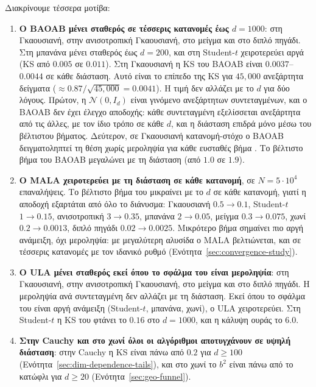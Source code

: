 Διακρίνουμε τέσσερα μοτίβα:

\begin{enumerate}
  \item \textbf{Ο BAOAB μένει σταθερός σε τέσσερις κατανομές έως $d=1000$}: στη
        Γκαουσιανή, στην ανισοτροπική Γκαουσιανή, στο μείγμα και στο διπλό πηγάδι.
        Στη μπανάνα μένει σταθερός έως $d=200$, και στη Student-$t$ χειροτερεύει
        αργά (KS από $0.005$ σε $0.011$). Στη Γκαουσιανή η KS του BAOAB είναι
        $0.0037$--$0.0044$ σε κάθε διάσταση. Αυτό είναι το επίπεδο της KS για
        $45{,}000$ ανεξάρτητα δείγματα ($\approx 0.87/\sqrt{45{,}000} = 0.0041$). Η τιμή δεν
        αλλάζει με το $d$ για δύο λόγους. Πρώτον, η $\mathcal{N}(0, I_d)$ είναι
        γινόμενο ανεξάρτητων συντεταγμένων, και ο BAOAB δεν έχει έλεγχο αποδοχής:
        κάθε συντεταγμένη εξελίσσεται ανεξάρτητα από τις άλλες, με τον ίδιο τρόπο
        σε κάθε $d$, και η διάσταση επιδρά μόνο μέσω του βέλτιστου βήματος.
        Δεύτερον, σε Γκαουσιανή κατανομή-στόχο ο BAOAB δειγματοληπτεί τη θέση χωρίς μεροληψία
      για κάθε ευσταθές βήμα \citep{leimkuhler2013bao}. Το βέλτιστο βήμα του
        BAOAB μεγαλώνει με τη διάσταση (από $1.0$ σε $1.9$).
  \item \textbf{Ο MALA χειροτερεύει με τη διάσταση σε κάθε κατανομή}, σε
        $N = 5 \cdot 10^4$ επαναλήψεις. Το βέλτιστο βήμα του μικραίνει με το $d$ σε
        κάθε κατανομή, γιατί η αποδοχή εξαρτάται από όλο το διάνυσμα: Γκαουσιανή
        $0.5 \to 0.1$, Student-$t$ $1 \to 0.15$, ανισοτροπική $3 \to 0.35$, μπανάνα
        $2 \to 0.05$, μείγμα $0.3 \to 0.075$, χωνί $0.2 \to 0.0013$, διπλό πηγάδι
        $0.02 \to 0.0025$. Μικρότερο βήμα σημαίνει πιο αργή ανάμειξη, όχι
        μεροληψία: με μεγαλύτερη αλυσίδα ο MALA βελτιώνεται, και σε τέσσερις
        κατανομές με τον ιδανικό ρυθμό (Ενότητα~\ref{sec:convergence-study}).
  \item \textbf{Ο ULA μένει σταθερός εκεί όπου το σφάλμα του είναι μεροληψία}: στη
        Γκαουσιανή, στην ανισοτροπική Γκαουσιανή, στο μείγμα και στο διπλό πηγάδι.
        Η μεροληψία ανά συντεταγμένη δεν αλλάζει με τη διάσταση. Εκεί όπου το
        σφάλμα του είναι αργή ανάμειξη (Student-$t$, μπανάνα, χωνί), ο ULA
        χειροτερεύει. Στη Student-$t$ η KS του φτάνει το $0.16$ στο $d=1000$, και η
        κάλυψη ουράς το $6.0$.
  \item \textbf{Στην Cauchy και στο χωνί όλοι οι αλγόριθμοι αποτυγχάνουν σε υψηλή
        διάσταση}: στην Cauchy η KS είναι πάνω από $0.2$ για $d \ge 100$
        (Ενότητα~\ref{sec:dim-dependence-tails}), και στο χωνί το $b^2$ είναι πάνω
        από το κατώφλι για $d \ge 20$ (Ενότητα~\ref{sec:geo-funnel}).
\end{enumerate}

